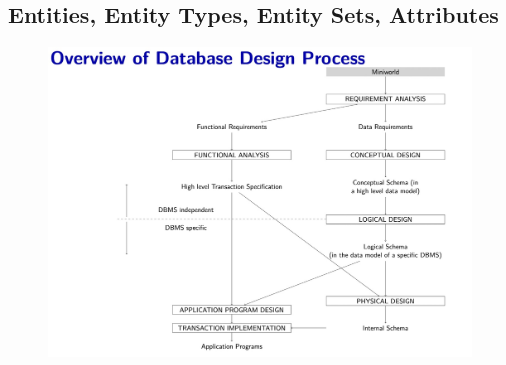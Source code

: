 \subsection{Entities, Entity Types, Entity Sets, Attributes}

\begin{figure}[H]
    \centering
    \includegraphics[width=0.75\linewidth]{images/Screenshot 2024-05-22 at 09.59.20.jpg}
\end{figure}


